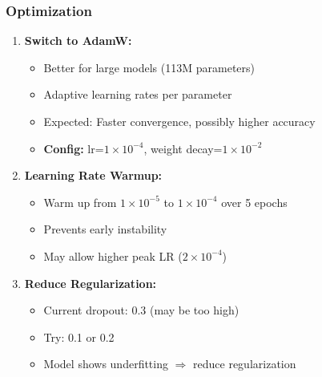 \documentclass[12pt,a4paper]{article}
\begin{document}
\subsubsection{Optimization}
\begin{enumerate}
    \item \textbf{Switch to AdamW:}
    \begin{itemize}
        \item Better for large models (113M parameters)
        \item Adaptive learning rates per parameter
        \item Expected: Faster convergence, possibly higher accuracy
        \item \textbf{Config:} lr=$1 \times 10^{-4}$, weight decay=$1 \times 10^{-2}$
    \end{itemize}
    
    \item \textbf{Learning Rate Warmup:}
    \begin{itemize}
        \item Warm up from $1 \times 10^{-5}$ to $1 \times 10^{-4}$ over 5 epochs
        \item Prevents early instability
        \item May allow higher peak LR ($2 \times 10^{-4}$)
    \end{itemize}
    
    \item \textbf{Reduce Regularization:}
    \begin{itemize}
        \item Current dropout: 0.3 (may be too high)
        \item Try: 0.1 or 0.2
        \item Model shows underfitting $\Rightarrow$ reduce regularization
    \end{itemize}
\end{enumerate}
\end{document}
